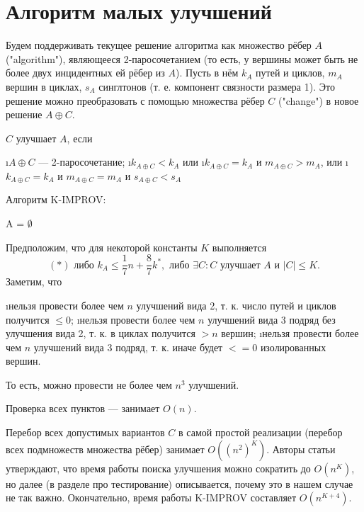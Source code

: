 \section{Алгоритм малых улучшений}
Будем поддерживать текущее решение алгоритма как множество рёбер $A$ ("algorithm"), являющееся 2-паросочетанием (то есть, у вершины может быть не более двух инцидентных ей рёбер из $A$). Пусть в нём $k_A$ путей и циклов, $m_A$ вершин в циклах, $s_A$ синглтонов (т. е. компонент связности размера 1). Это решение можно преобразовать с помощью множества рёбер $C$ ("change") в новое решение $A \oplus C$. 

$C$ улучшает $A$, если 
\begin{enumerate}[label=\protect\circled{{\arabic*}}]
	\i $A \oplus C$ --- 2-паросочетание;
	\i $k_{A \oplus C} < k_A$ или
	\i $k_{A \oplus C} = k_A$ и $m_{A \oplus C} > m_A$, или
	\i $k_{A \oplus C} = k_A$ и $m_{A \oplus C} = m_A$ и $s_{A \oplus C} < s_A$
\end{enumerate}

Алгоритм K-IMPROV:

\begin{algorithm}[H]
 A = $\emptyset$\;
\end{algorithm}

Предположим, что для некоторой константы $K$ выполняется 
$$(*) \text{ либо } k_A \le \frac{1}{7}n+\frac{8}{7}k^*, \text{ либо } \exists C: C \text{ улучшает } A \textbf{ и } |C|\le K.$$
Заметим, что
\begin{itemize}
 \i нельзя провести более чем $n$ улучшений вида 2, т. к. число путей и циклов получится $\le0$;
 \i нельзя провести более чем $n$ улучшений вида 3 подряд без улучшения вида 2, т. к. в циклах получится $>n$ вершин;
 \i нельзя провести более чем $n$ улучшений вида 3 подряд, т. к. иначе будет $<= 0$ изолированных вершин. 
\end{itemize}
То есть, можно провести не более чем $n^3$ улучшений.

Проверка всех пунктов  ---  занимает $O(n)$.

Перебор всех допустимых вариантов $C$ в самой простой реализации (перебор всех подмножеств множества рёбер) занимает $O((n^2)^K)$. Авторы статьи утверждают, что время работы поиска улучшения можно сократить до  $O(n^K)$, но далее (в разделе про тестирование) описывается, почему это в нашем случае не так важно. Окончательно, время работы K-IMPROV составляет $O(n^{K+4})$.

